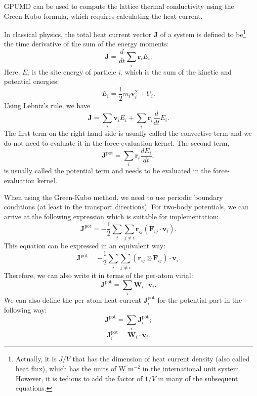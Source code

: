 \documentclass[12pt,a4paper]{report}
\newcommand{\vect}[1]{\boldsymbol{#1}}
\begin{document}
GPUMD can be used to compute the lattice thermal conductivity using the Green-Kubo \cite{green1954jcp,kubo1957jpsj} formula, which requires calculating the heat current.

In classical physics, the total heat current vector $\vect{J}$ of a system is defined to be\footnote{Actually, it is $J/V$ that has the dimension of heat current density (also called heat flux), which has the units of W m$^{-2}$ in the international unit system. However, it is tedious to add the factor of $1/V$ in many of the subsequent equations.} the time derivative of the sum of the energy moments:
\begin{equation}
\vect{J} = \frac{d}{dt} \sum_i \vect{r}_i E_i.
\end{equation}
Here, $E_i$ is the site energy of particle $i$, which is the sum of the kinetic and potential energies:
\begin{equation}
E_i = \frac{1}{2}m_i \vect{v}_i^2 + U_i.
\end{equation}
Using Lebniz's rule, we have
\begin{equation}
\vect{J} = \sum_i \vect{v}_i E_i +  \sum_i \vect{r}_i \frac{d}{dt} E_i.
\end{equation}
The first term on the right hand side is usually called the convective term and we do not need to evaluate it in the force-evaluation kernel. The second term,
\begin{equation}
\vect{J}^{\text{pot}} = \sum_i \vect{r}_i \frac{d E_i} {dt},
\end{equation}
is usually called the potential term and needs to be evaluated in the force-evaluation kernel.

When using the Green-Kubo method, we need to use periodic boundary conditions (at least in the transport directions). For two-body potentials, we can arrive at the following expression which is suitable for implementation:
\begin{equation}
\vect{J}^{\text{pot}} = -\frac{1}{2} \sum_i \sum_{j \neq i}
\vect{r}_{ij}  \left( \vect{F}_{ij} \cdot \vect{v}_i \right).
\end{equation}
This equation can be expressed in an equivalent way:
\begin{equation}
\vect{J}^{\text{pot}} = -\frac{1}{2} \sum_i \sum_{j \neq i}
\left( \vect{r}_{ij} \otimes  \vect{F}_{ij} \right) \cdot \vect{v}_i .
\end{equation}
Therefore, we can also write it in terms of the per-atom virial:
\begin{equation}
\vect{J}^{\text{pot}} = \sum_i \textbf{W}_i \cdot \vect{v}_i.
\end{equation}
We can also define the per-atom heat current $\vect{J}_i^{\text{pot}}$ for the potential part in the following way:
\begin{equation}
\vect{J}^{\text{pot}} = \sum_i \vect{J}^{\text{pot}}_i;
\end{equation}
\begin{equation}
\vect{J}^{\text{pot}}_i = \textbf{W}_i \cdot \vect{v}_i.
\end{equation}
\end{document}
